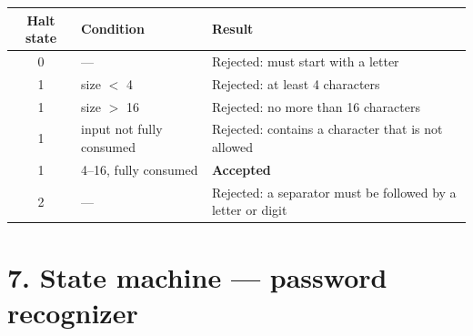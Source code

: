 \documentclass[11pt,a4paper]{article}
\begin{document}
\begin{center}
\begin{tabular}{@{}cll@{}}
\hline
\textbf{Halt state} & \textbf{Condition} & \textbf{Result}\\
\hline
0 & ---                       & Rejected: must start with a letter\\
1 & size $<$ 4                & Rejected: at least 4 characters\\
1 & size $>$ 16               & Rejected: no more than 16 characters\\
1 & input not fully consumed  & Rejected: contains a character that is not allowed\\
1 & 4--16, fully consumed     & \textbf{Accepted}\\
2 & ---                       & Rejected: a separator must be followed by a letter or digit\\
\hline
\end{tabular}
\end{center}

\newpage
\section*{7. State machine --- password recognizer}
\end{document}
